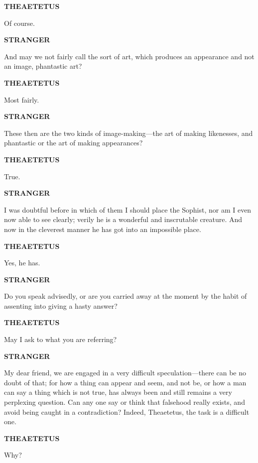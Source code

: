 \documentclass[11pt,letter]{article}
\begin{document}
\par \textbf{THEAETETUS}
\par   Of course.

\par \textbf{STRANGER}
\par   And may we not fairly call the sort of art, which produces an appearance and not an image, phantastic art?

\par \textbf{THEAETETUS}
\par   Most fairly.

\par \textbf{STRANGER}
\par   These then are the two kinds of image-making—the art of making likenesses, and phantastic or the art of making appearances?

\par \textbf{THEAETETUS}
\par   True.

\par \textbf{STRANGER}
\par   I was doubtful before in which of them I should place the Sophist, nor am I even now able to see clearly; verily he is a wonderful and inscrutable creature. And now in the cleverest manner he has got into an impossible place.

\par \textbf{THEAETETUS}
\par   Yes, he has.

\par \textbf{STRANGER}
\par   Do you speak advisedly, or are you carried away at the moment by the habit of assenting into giving a hasty answer?

\par \textbf{THEAETETUS}
\par   May I ask to what you are referring?

\par \textbf{STRANGER}
\par   My dear friend, we are engaged in a very difficult speculation—there can be no doubt of that; for how a thing can appear and seem, and not be, or how a man can say a thing which is not true, has always been and still remains a very perplexing question. Can any one say or think that falsehood really exists, and avoid being caught in a contradiction? Indeed, Theaetetus, the task is a difficult one.

\par \textbf{THEAETETUS}
\par   Why?
\end{document}

